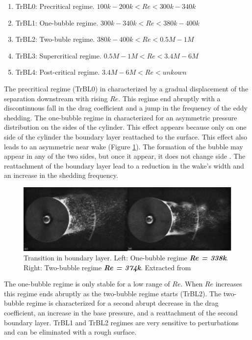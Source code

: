 \documentclass[journal]{new-aiaa}
\begin{document}
\begin{enumerate}[label=(\roman*)]
\item TrBL0: Precritical regime. $100k-200k<Re<300k-340k$
\item TrBL1: One-bubble regime. $300k-340k<Re<380k-400k$
\item TrBL2: Two-buble regime. $380k-400k<Re<0.5M-1M$
\item TrBL3: Supercritical regime. $0.5M-1M<Re<3.4M-6M$
\item TrBL4: Post-critical regime. $3.4M-6M<Re<unkown$
\end{enumerate}

The precritical regime (TrBL0) in characterized by a gradual displacement of the separation downstream with rising $Re$. This regime end abruptly with a discontinuous fall in the drag coefficient and a jump in the frequency of the eddy shedding. The one-bubble regime in characterized for an asymmetric pressure distribution on the sides of the cylinder. This effect appears because only on one side of the cylinder the boundary layer reattached to the surface. This effect also leads to an asymmetric near wake (Figure \ref{fig:TrBL}). The formation of the bubble may appear in any of the two sides, but once it appear, it does not change side \citep{Zdravkovich1997}. The reattachment of the boundary layer lead to a reduction in the wake's width and an increase in the shedding frequency. 


\begin{figure}[H]
\begin{center}
\includegraphics[width=1\textwidth]{Images/federico/Figure06}
\caption{Transition in boundary layer. Left: One-bubble regime \textbf{\textit{Re = 338k}}. Right: Two-bubble regime \textbf{\textit{Re = 374k}}. Extracted from \cite{Almosnino1984}}
\label{fig:TrBL}
\end{center}
\end{figure}


The one-bubble regime is only stable for a low range of $Re$. When $Re$ increases this regime ends abruptly as the two-bubble regime starts (TrBL2). The two-bubble regime is characterized for a second abrupt decrease in the drag coefficient, an increase in the base pressure, and a reattachment of the second boundary layer. TrBL1 and TrBL2  regimes are very sensitive to perturbations and can be eliminated with a rough surface.
\end{document}
